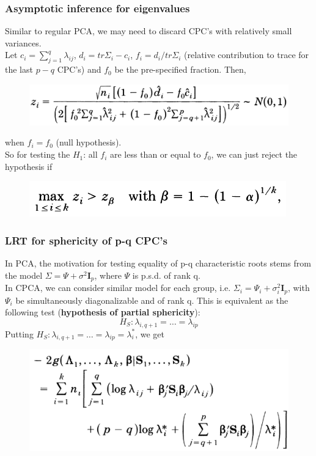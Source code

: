 \documentclass{beamer}
\begin{document}
	\begin{frame}
		\frametitle{Asymptotic inference for eigenvalues}
		Similar to regular PCA, we may need to discard CPC's with relatively small variances.\\
		Let $c_i=\sum_{j=1}^{q}\lambda_{ij}$, $d_i = tr\Sigma_i - c_i$, $f_i = d_i/tr\Sigma_i$ (relative contribution to trace for the last $p-q$ CPC's) and $f_0$ be the pre-specified fraction. Then,
		\begin{figure}
			\includegraphics[width=.7\linewidth]{image013.png}
		\end{figure}
		when $f_i = f_0$ (null hypothesis).\\
		So for testing the $H_1$: all $f_i$ are less than or equal to $f_0$, we can just reject the hypothesis if 
		\begin{figure}
			\includegraphics[width=.5\linewidth]{image014.png}
		\end{figure}
	\end{frame}
	
	
	\begin{frame}
		\frametitle{LRT for sphericity of p-q CPC's}
		In PCA, the motivation for testing equality of p-q characteristic roots stems from the model $\Sigma = \Psi + \sigma^2\bm{I}_p$, where $\Psi$ is p.s.d. of rank q.\\
		
		In CPCA, we can consider similar model for each group, i.e. $\Sigma_i = \Psi_i + \sigma_i^2\bm{I}_p$, with $\Psi_i$ be simultaneously diagonalizable and of rank q. This is equivalent as the following test (\textbf{hypothesis of partial sphericity}):
		$$H_S: \lambda_{i,q+1}=\ldots=\lambda_{ip}$$
		Putting $H_S: \lambda_{i,q+1}=\ldots=\lambda_{ip} = \lambda_i^*$, we get
		\begin{figure}
			\includegraphics[width=.6\linewidth]{image015.png}
		\end{figure}
	\end{frame}
	
\end{document}
